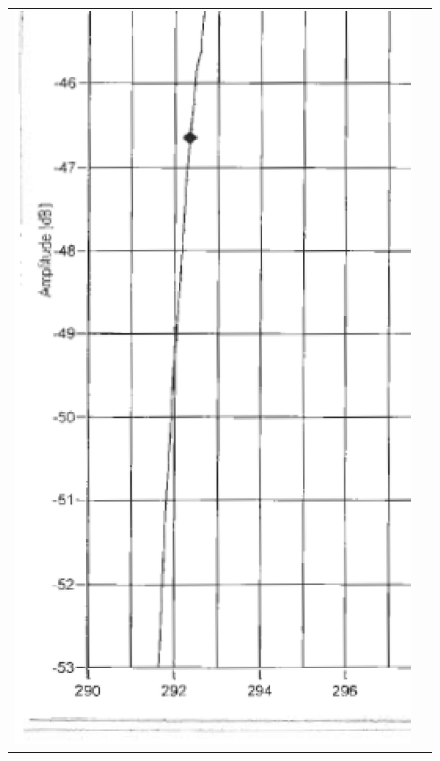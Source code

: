 \begin{figure}[H]
\begin{tabular}{c c}
    \includegraphics[bb=249 194 1431 1035,scale=0.2]{graphics/log_book/ch13_lowf.eps} & 

\end{tabular}
\end{figure}
